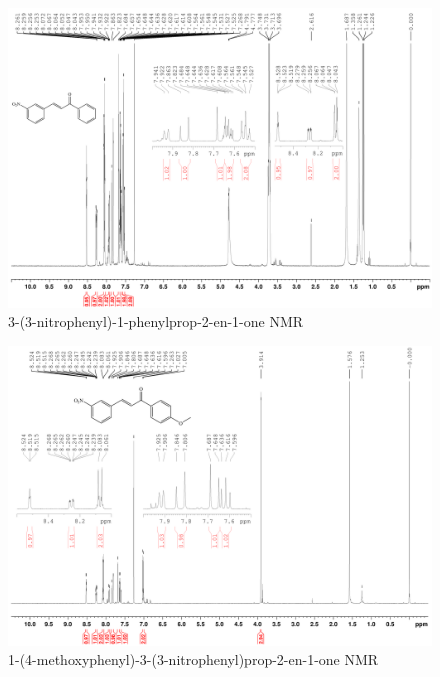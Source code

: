 \documentclass[12pt]{article}
\begin{document}
\newpage
\begin{figure}[H]
    \centering
    \includegraphics[scale=0.105]{spectra/nmr7.1.png}
    \caption{3-(3-nitrophenyl)-1-phenylprop-2-en-1-one NMR}
\end{figure}
\begin{figure}[H]
    \centering
    \includegraphics[scale=0.105]{spectra/nmr7.2.png}
    \caption{1-(4-methoxyphenyl)-3-(3-nitrophenyl)prop-2-en-1-one NMR}
\end{figure}
\end{document}
